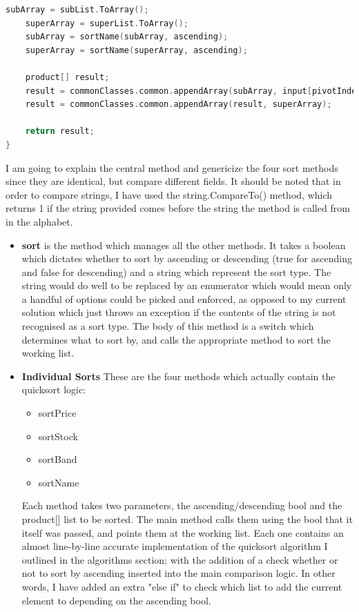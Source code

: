 ﻿\documentclass{article}
\begin{document}
\begin{lstlisting}[language=C]
    subArray = subList.ToArray();
    superArray = superList.ToArray();
    subArray = sortName(subArray, ascending);
    superArray = sortName(superArray, ascending);

    product[] result;
    result = commonClasses.common.appendArray(subArray, input[pivotIndex]);
    result = commonClasses.common.appendArray(result, superArray);

    return result;
}
    \end{lstlisting}
    I am going to explain the central method and genericize the four sort methods since they are identical, but compare different fields.
    It should be noted that in order to compare strings, I have used the string.CompareTo() method, which returns 1 if the string provided comes before the string the method is called from in the alphabet.
    \begin{itemize}
        \item \textbf{sort} is the method which manages all the other methods.
        It takes a boolean which dictates whether to sort by ascending or descending (true for ascending and false for descending) and a string which represent the sort type.
        The string would do well to be replaced by an enumerator which would mean only a handful of options could be picked and enforced, as opposed to my current solution which just throws an exception if the contents of the string is not recognised as a sort type.
        The body of this method is a switch which determines what to sort by, and calls the appropriate method to sort the working list.
        \item \textbf{Individual Sorts} These are the four methods which actually contain the quicksort logic:
        \begin{itemize}
            \item sortPrice
            \item sortStock
            \item sortBand
            \item sortName
        \end{itemize}
        Each method takes two parameters, the ascending/descending bool and the product[] list to be sorted.
        The main method calls them using the bool that it itself was passed, and points them at the working list.
        Each one contains an almost line-by-line accurate implementation of the quicksort algorithm I outlined in the algorithms section; with the addition of a check whether or not to sort by ascending inserted into the main comparison logic.
        In other words, I have added an extra "else if" to check which list to add the current element to depending on the ascending bool.
    \end{itemize}
\end{document}
